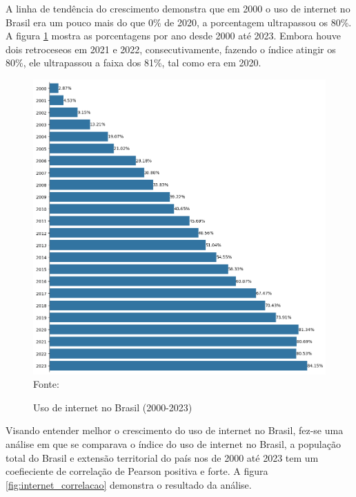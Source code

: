 A linha de tendência do crescimento demonstra que em 2000 o uso de internet no Brasil era um pouco mais do que 0\% de 2020, a porcentagem ultrapassou os 80\%. A figura \ref{fig:uso_internet_brasil_itu} mostra as porcentagens por ano desde 2000 até 2023. Embora houve dois retroceseos em 2021 e 2022, consecutivamente, fazendo o índice atingir os 80\%, ele ultrapassou a faixa dos 81\%, tal como era em 2020.

\begin{figure}[ht]
    \centering
    \caption{Uso de internet no Brasil (2000-2023)}
    \includegraphics[width=1\linewidth]{figuras/internet/barplot_uso_internet_brasil_itu.png}
    \label{fig:uso_internet_brasil_itu}
    \footnotesize{Fonte: \cite{ITU_uso_internet_brasil}}
\end{figure}

Visando entender melhor o crescimento do uso de internet no Brasil, fez-se uma análise em que se comparava o índice do uso de internet no Brasil, a população total do Brasil e extensão territorial do país nos de 2000 até 2023 tem um coefieciente de correlação de Pearson positiva e forte. A figura \ref{fig:internet_correlacao} demonstra o resultado da análise.

